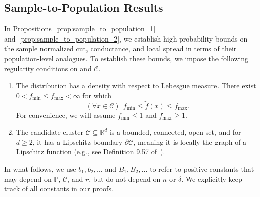 \documentclass[twoside,11pt]{article}
\newcommand{\Reals}{\mathbb{R}}
\newcommand{\1}{\mathbf{1}}
\newcommand{\Rd}{\Reals^d}
\newcommand{\mc}[1]{\mathcal{#1}}
\newcommand{\Pbb}{\mathbb{P}}
\newcommand{\wt}[1]{\widetilde{#1}}
\begin{document}
\subsection{Sample-to-Population Results}
\label{subsec:sample_to_population}
In Propositions~\ref{prop:sample_to_population_1} and~\ref{prop:sample_to_population_2}, we establish high probability bounds on the sample normalized cut, conductance, and local spread in terms of their population-level analogues. To establish these bounds, we impose the following regularity conditions on \smash{$\wt{\Pbb}$} and $\mc{C}$.
\begin{enumerate}[label=(A\arabic*)]
	\item 
	\label{asmp:bounded_density} 
	The distribution \smash{$\wt{\Pbb}$} has a density \smash{$\wt{f}: \mc{C} \to (0,\infty)$} with respect to Lebesgue measure. There exist $0 < f_{\min} \leq f_{\max} < \infty$ for which
	\begin{equation*}
	(\forall x \in \mc{C})~~ f_{\min} \leq \wt{f}(x) \leq f_{\max}.
	\end{equation*}
	For convenience, we will assume $f_{\min} \leq 1$ and $f_{\max} \geq 1$.
	\item 
	\label{asmp:domain} 
	The candidate cluster $\mc{C} \subseteq \Rd$ is a bounded, connected, open set, and for $d \geq 2$, it has a Lipschitz boundary $\partial \mc{C}$, meaning it is locally the graph of a Lipschitz function (e.g., see Definition 9.57 of~\cite{leoni2017}).
\end{enumerate}

In what follows, we use $b_1,b_2,\ldots$ and $B_1,B_2,\ldots$ to refer to positive constants that may depend on $\Pbb$, $\mc{C}$, and $r$, but do not depend on $n$ or $\delta$. We explicitly keep track of all constants in our proofs.
\end{document}

